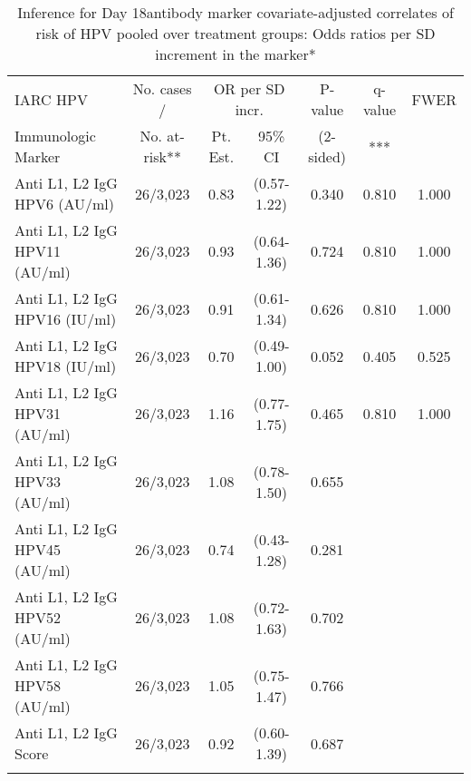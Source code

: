 \begin{longtable}{lcccccc}
\caption{Inference for Day 18antibody marker covariate-adjusted correlates of risk of HPV pooled over treatment groups: Odds ratios per SD increment in the marker*} \\ 
   \hline
 
         \multicolumn{1}{l}{IARC HPV} & \multicolumn{1}{c}{No. cases /}   & \multicolumn{2}{c}{OR per SD incr.}                     & \multicolumn{1}{c}{P-value}   & \multicolumn{1}{c}{q-value}   & \multicolumn{1}{c}{FWER} \\ 
         \multicolumn{1}{l}{Immunologic Marker}            & \multicolumn{1}{c}{No. at-risk**} & \multicolumn{1}{c}{Pt. Est.} & \multicolumn{1}{c}{95\% CI} & \multicolumn{1}{c}{(2-sided)} & \multicolumn{1}{c}{***} & \multicolumn{1}{c}{} \\ 
         \hline
 
    Anti L1, L2 IgG HPV6 (AU/ml) & 26/3,023 & 0.83 & (0.57-1.22) & 0.340 & 0.810 & 1.000 \\ 
  Anti L1, L2 IgG HPV11 (AU/ml) & 26/3,023 & 0.93 & (0.64-1.36) & 0.724 & 0.810 & 1.000 \\ 
  Anti L1, L2 IgG HPV16 (IU/ml) & 26/3,023 & 0.91 & (0.61-1.34) & 0.626 & 0.810 & 1.000 \\ 
  Anti L1, L2 IgG HPV18 (IU/ml) & 26/3,023 & 0.70 & (0.49-1.00) & 0.052 & 0.405 & 0.525 \\ 
  Anti L1, L2 IgG HPV31 (AU/ml) & 26/3,023 & 1.16 & (0.77-1.75) & 0.465 & 0.810 & 1.000 \\ 
  Anti L1, L2 IgG HPV33 (AU/ml) & 26/3,023 & 1.08 & (0.78-1.50) & 0.655 &     &     \\ 
  Anti L1, L2 IgG HPV45 (AU/ml) & 26/3,023 & 0.74 & (0.43-1.28) & 0.281 &     &     \\ 
  Anti L1, L2 IgG HPV52 (AU/ml) & 26/3,023 & 1.08 & (0.72-1.63) & 0.702 &     &     \\ 
  Anti L1, L2 IgG HPV58 (AU/ml) & 26/3,023 & 1.05 & (0.75-1.47) & 0.766 &     &     \\ 
  Anti L1, L2 IgG Score & 26/3,023 & 0.92 & (0.60-1.39) & 0.687 &     &     \\ 
   \hline
\hline
\label{tab:CoR_univariable_logistic_pretty_scaled}
\end{longtable}
